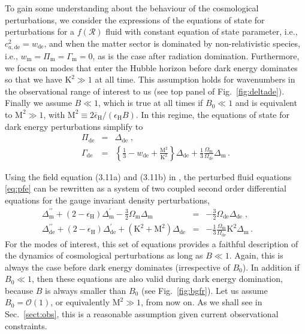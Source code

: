 \documentclass[nofootinbib,a4paper,aps,prd,10pt,superscriptaddress,reprint,showkeys,showpacs]{revtex4-1}
\newcommand{\qsubrm}[2]{{#1}_{\scriptscriptstyle{\textrm{#2}}}}
\def\bea{\begin{eqnarray}}
\def\eea{\end{eqnarray}}
\def\bse{\begin{subequations}}
\def\ese{\end{subequations}}
\begin{document}
To gain some understanding about the behaviour of the cosmological perturbations, we consider the expressions of the 
equations of state for perturbations for a $f(\mathcal{R})$ fluid with constant equation of state parameter, i.e., 
$c_{a,\scriptscriptstyle{\mathrm{de}}}^2 = \qsubrm{w}{de}$, and when the matter sector is dominated by non-relativistic 
species, i.e., $\qsubrm{w}{m} = \qsubrm{\Pi}{m} = \qsubrm{\Gamma}{m} =0$, as is the case after radiation domination. 
Furthermore, we focus on modes that enter the Hubble horizon before dark energy dominates so that we have 
$\mathrm{K}^2\gg1$ at all time. This assumption holds for wavenumbers in the observational range of interest to us 
(see top panel of Fig.~\ref{fig:deltade}). Finally we assume $B\ll1$, which is true at all times if 
$\qsubrm{B}{0}\ll1$ and is equivalent to $\mathrm{M^2}\gg1$, with 
$\mathrm{M}^2\equiv 2\qsubrm{\bar{\epsilon}}{H}/(\qsubrm{\epsilon}{H}B)$.
In this regime, the equations of state for dark energy perturbations simplify to
\bse
 \bea
  \qsubrm{\Pi}{de} & = & \qsubrm{\Delta}{de}\;,\label{eqn:Pi_de}\\
  \qsubrm{\Gamma}{de} & = & \left\{\tfrac{1}{3}-\qsubrm{w}{de}+\tfrac{\mathrm{M}^2}{\mathrm{K}^2}\right\}
  \qsubrm{\Delta}{de} + \tfrac{1}{3}\tfrac{\qsubrm{\Omega}{m}}{\qsubrm{\Omega}{de}}\qsubrm{\Delta}{m}\,.
 \eea
\ese

Using the field equation (3.11a) and (3.11b) in \citep{Battye2016a}, the perturbed fluid equations \eqref{eq:pfe} can 
be rewritten as a system of two coupled second order differential equations for the gauge invariant density 
perturbations,
\bse\label{eqn:Deltapp}
 \bea
  \qsubrm{\Delta}{m}^{\prime\prime} + (2-\qsubrm{\epsilon}{H})\qsubrm{\Delta}{m}^\prime - 
  \tfrac{3}{2}\qsubrm{\Omega}{m}\qsubrm{\Delta}{m} & = & -\tfrac{3}{2}\qsubrm{\Omega}{de}\qsubrm{\Delta}{de}\;,
  \label{eq:dmde}\\
  \qsubrm{\Delta}{de}^{\prime\prime} + (2-\qsubrm{\epsilon}{H})\qsubrm{\Delta}{de}^\prime + 
  ({\mathrm{K}^2}+{\mathrm{M}^2})\qsubrm{\Delta}{de} & = & -\tfrac{1}{3}\tfrac{\qsubrm{\Omega}{m}}{\qsubrm{\Omega}{de}}
  \mathrm{K}^2\qsubrm{\Delta}{m}\,.\,\,\,\,\,\,\quad
  \label{eq:dede}
 \eea
\ese
For the modes of interest, this set of equations provides a faithful description of the dynamics of cosmological 
perturbations as long as $B\ll 1$. Again, this is always the case before dark energy dominates (irrespective of 
$\qsubrm{B}{0}$). In addition if $\qsubrm{B}{0}\ll 1$, then these equations are also valid during dark energy 
domination, because $B$ is always smaller than $\qsubrm{B}{0}$ (see Fig.~\ref{fig:bgfr}). Let us assume 
$\qsubrm{B}{0}=\mathcal{O}(1)$, or equivalently $\mathrm{M}^2 \gg 1$, from now on. As we shall see in 
Sec.~\ref{sect:obs}, this is a reasonable assumption given current observational constraints.
\end{document}
